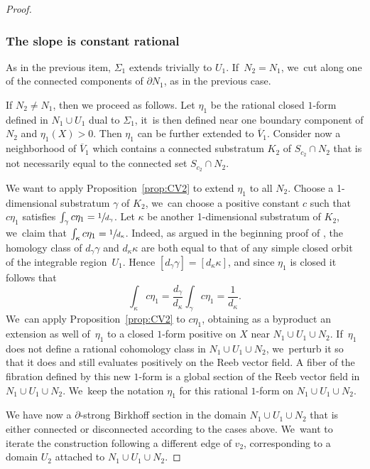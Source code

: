 \documentclass[10pt]{amsart}
\theoremstyle{definition}
\begin{document}
\begin{proof}
\subsubsection*{The slope is constant rational} As in the previous item, $\Sigma_1$ extends trivially to $U_1$. If~$N_2=N_1$, we~cut along one of the connected components of $\partial N_1$, as in the previous case.

If $N_2\neq N_1$, then we proceed as follows. Let $\eta_1$ be the rational closed $1$-form defined in $N_1\cup U_1$ dual to $\Sigma_1$, it~is then defined near one boundary component of $N_2$ and $\eta_1(X)>0$. Then $\eta_1$ can be further extended to $\overline V_1$. Consider now a neighborhood of $\overline{V}_1$ which contains a connected substratum $K_2$ of $S_{c_2}\cap N_2$ that is not necessarily equal to the connected set $S_{c_2}\cap N_2$.

We want to apply Proposition~\ref{prop:CV2} to extend $\eta_1$ to all $N_2$. Choose a 1-dimensional substratum $\gamma$ of $K_2$, we~can choose a positive constant $c$ such that $c\eta_1$ satisfies $\int_\gamma c\eta_1=\sfrac{1}{d_{\gamma}}$. Let $\kappa$ be another 1-dimensional substratum of $K_2$, we~claim that $\int_{\kappa} c\eta_1=\sfrac{1}{d_{\kappa}}$. Indeed, as argued in the beginning proof of \cite[Prop.\,3.2]{CV2}, the homology class of $d_{\gamma}\gamma$ and $d_{\kappa}\kappa$ are both equal to that of any simple closed orbit of the integrable region~$U_1$. Hence $[d_{\gamma}\gamma]=[d_{\kappa}\kappa]$, and since $\eta_1$ is closed it follows that
\[
\int_{\kappa} c\eta_1= \frac{d_{\gamma}}{d_{\kappa}} \int_\gamma c\eta_1=\frac{1}{d_{\kappa}}.
\]
We~can apply Proposition~\ref{prop:CV2} to $c\eta_1$, obtaining as a byproduct an extension as well of~$\eta_1$ to a closed $1$-form positive on $X$ near $N_1\cup U_1\cup N_2$. If~$\eta_1$ does not define a rational cohomology class in $N_1\cup U_1\cup N_2$, we~perturb it so that it does and still evaluates positively on the Reeb vector field. A fiber of the fibration defined by this new $1$-form is a global section of the Reeb vector field in $N_1\cup U_1\cup N_2$. We~keep the notation $\eta_1$ for this rational $1$-form on $N_1\cup U_1\cup N_2$.

We have now a $\partial$-strong Birkhoff section in the domain $N_1\cup U_1\cup N_2$ that is either connected or disconnected according to the cases above. We~want to iterate the construction following a different edge of $v_2$, corresponding to a domain $U_2$ attached to $N_1\cup U_1\cup N_2$.


\end{proof}
\end{document}
